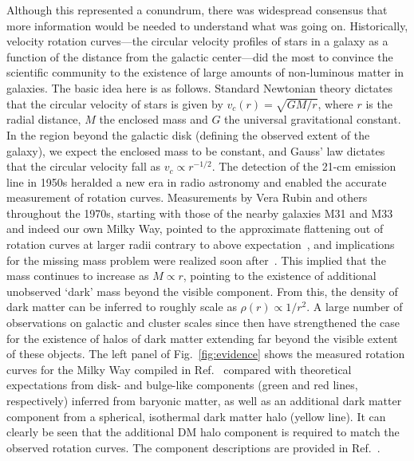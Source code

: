 Although this represented a conundrum, there was widespread consensus that more information would be needed to understand what was going on. Historically, velocity rotation curves---the circular velocity profiles of stars in a galaxy as a function of the distance from the galactic center---did the most to convince the scientific community to the existence of large amounts of non-luminous matter in galaxies. The basic idea here is as follows. Standard Newtonian theory dictates that the circular velocity of stars is given by $v_c(r) = \sqrt{GM/r}$, where $r$ is the radial distance, $M$ the enclosed mass and $G$ the universal gravitational constant. In the region beyond the galactic disk (defining the observed extent of the galaxy), we expect the enclosed mass to be constant, and Gauss' law dictates that the circular velocity fall as $v_c \propto r^{-1/2}$. The detection of the 21-cm emission line in 1950s heralded a new era in radio astronomy and enabled the accurate measurement of rotation curves. Measurements by Vera Rubin and others throughout the 1970s, starting with those of the nearby galaxies M31 and M33 and indeed our own Milky Way, pointed to the approximate flattening out of rotation curves at larger radii contrary to above expectation~\cite{1970ApJ...159..379R,1973A&A....26..483R}, and implications for the missing mass problem were realized soon after~\cite{1974Natur.250..309E,1974ApJ...193L...1O}. This implied that the mass continues to increase as $M \propto r$, pointing to the existence of additional unobserved `dark' mass beyond the visible component. From this, the density of dark matter can be inferred to roughly scale as $\rho(r) \propto 1/r^2$. A large number of observations on galactic and cluster scales since then have strengthened the case for the existence of halos of dark matter extending far beyond the visible extent of these objects. The left panel of Fig.~\ref{fig:evidence} shows the measured rotation curves for the Milky Way compiled in Ref.~\cite{2009PASJ...61..227S} compared with theoretical expectations from disk- and bulge-like components (green and red lines, respectively) inferred from baryonic matter, as well as an additional dark matter component from a spherical, isothermal dark matter halo (yellow line). It can clearly be seen that the additional DM halo component is required to match the observed rotation curves. The component descriptions are provided in Ref.~\cite{2009PASJ...61..227S}.

